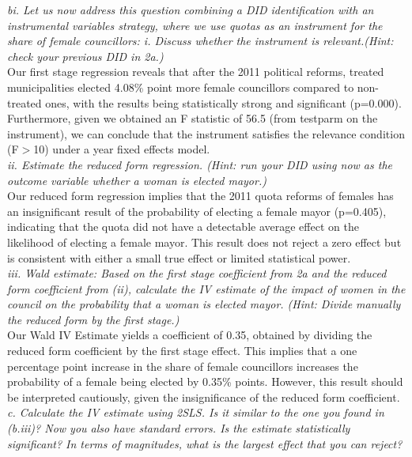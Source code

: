 \documentclass[12pt]{article}
\begin{document}
\noindent
\textit{bi. Let us now address this question combining a DID identification with an instrumental variables strategy, where we use quotas as an instrument for the share of female councillors:
i. Discuss whether the instrument is relevant.(Hint: check your previous DID in 2a.)} \\

Our first stage regression reveals that after the 2011 political reforms, treated municipalities elected 4.08\% point more female councillors compared to non-treated ones, with the results being statistically strong and significant (p=0.000). Furthermore, given we obtained an F statistic of 56.5 (from testparm on the instrument), we can conclude that the instrument satisfies the relevance condition (F$>$10) under a year fixed effects model.\\

\noindent
\textit{ii. Estimate the reduced form regression. (Hint: run your DID using now as the outcome variable whether a woman is elected mayor.)}\\ 

Our reduced form regression implies that the 2011 quota reforms of females has an insignificant result of the probability of electing a female mayor (p=0.405), indicating that the quota did not have a detectable average effect on the likelihood of electing a female mayor. This result does not reject a zero effect but is consistent with either a small true effect or limited statistical power.\\

\noindent
\textit{iii.  Wald estimate: Based on the first stage coefficient from 2a and the reduced form coefficient from (ii), calculate the IV estimate of the impact of women in the council on the probability that a woman is 
elected mayor. (Hint: Divide manually the reduced form by the first 
stage.)} \\

Our Wald IV Estimate yields a coefficient of 0.35, obtained by dividing the reduced form coefficient by the first stage effect. This implies that a one percentage point increase in the share of female councillors increases the probability of a female being elected by 0.35\% points. However, this result should be interpreted cautiously, given the insignificance of the reduced form coefficient.\\

\noindent
\textit{c. Calculate the IV estimate using 2SLS. Is it similar to the one you found in (b.iii)? Now you also have standard errors. Is the estimate statistically significant? In terms of magnitudes, what is the largest effect that you can reject?}\\
\end{document}
